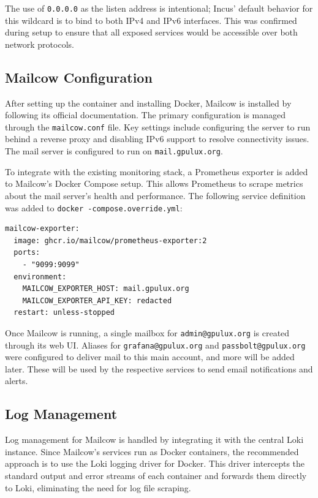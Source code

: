 The use of \texttt{0.0.0.0} as the listen address is intentional; Incus' default behavior for this wildcard is to bind to both IPv4 and IPv6 interfaces. This was confirmed during setup to ensure that all exposed services would be accessible over both network protocols.

\subsection*{Mailcow Configuration}

After setting up the container and installing Docker, Mailcow is installed by following its official documentation\cite{mailcow-install}. The primary configuration is managed through the \texttt{mailcow.conf} file. Key settings include configuring the server to run behind a reverse proxy\cite{mailcow-reverse-proxy} and disabling IPv6 support to resolve connectivity issues\cite{mailcow-disable-ipv6}. The mail server is configured to run on \texttt{mail.gpulux.org}.

To integrate with the existing monitoring stack, a Prometheus exporter is added to Mailcow's Docker Compose setup. This allows Prometheus to scrape metrics about the mail server's health and performance. The following service definition was added to \texttt{docker -compose.override.yml}\cite{mailcow-prometheus-exporter}:

\begin{lstlisting}[caption={Docker Compose service definition for the Mailcow Prometheus exporter}]
mailcow-exporter:
  image: ghcr.io/mailcow/prometheus-exporter:2
  ports:
    - "9099:9099"
  environment:
    MAILCOW_EXPORTER_HOST: mail.gpulux.org
    MAILCOW_EXPORTER_API_KEY: redacted
  restart: unless-stopped
\end{lstlisting}

Once Mailcow is running, a single mailbox for \texttt{admin@gpulux.org} is created through its web UI. Aliases for \texttt{grafana@gpulux.org} and \texttt{passbolt@gpulux.org} were configured to deliver mail to this main account, and more will be added later. These will be used by the respective services to send email notifications and alerts.

\subsection*{Log Management}

Log management for Mailcow is handled by integrating it with the central Loki instance. Since Mailcow's services run as Docker containers, the recommended approach is to use the Loki logging driver for Docker\cite{loki-docker-driver}. This driver intercepts the standard output and error streams of each container and forwards them directly to Loki, eliminating the need for log file scraping.

